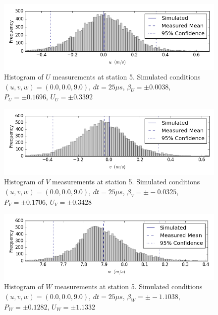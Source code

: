 \begin{figure}[H]
\centering
\includegraphics[width=6in]{figs/Ely_May28th05003/uncertainty_Ely_May28th05003_U}
\caption{Histogram of $U$ measurements at station 5. Simulated conditions $(u,v,w)=(0.0, 0.0, 9.0)$, $dt=25 \mu s$, $\beta_U=\pm 0.0038$, $P_U=\pm 0.1696$, $U_U=\pm 0.3392$}
\label{fig:uncertainty_Ely_May28th05003_U}
\end{figure}


\begin{figure}[H]
\centering
\includegraphics[width=6in]{figs/Ely_May28th05003/uncertainty_Ely_May28th05003_V}
\caption{Histogram of $V$ measurements at station 5. Simulated conditions $(u,v,w)=(0.0, 0.0, 9.0)$, $dt=25 \mu s$, $\beta_V=\pm -0.0325$, $P_V=\pm 0.1706$, $U_V=\pm 0.3428$}
\label{fig:uncertainty_Ely_May28th05003_V}
\end{figure}


\begin{figure}[H]
\centering
\includegraphics[width=6in]{figs/Ely_May28th05003/uncertainty_Ely_May28th05003_W}
\caption{Histogram of $W$ measurements at station 5. Simulated conditions $(u,v,w)=(0.0, 0.0, 9.0)$, $dt=25 \mu s$, $\beta_W=\pm -1.1038$, $P_W=\pm 0.1282$, $U_W=\pm 1.1332$}
\label{fig:uncertainty_Ely_May28th05003_W}
\end{figure}


